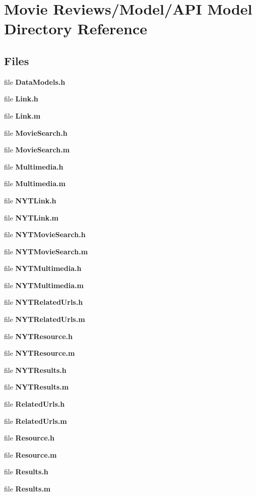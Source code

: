 \section{Movie Reviews/\+Model/\+A\+P\+I Model Directory Reference}
\label{dir_39b7a2f16d8bb207ce5a94853759f064}
\subsection*{Files}
\begin{DoxyCompactItemize}
\item 
file {\bfseries Data\+Models.\+h}
\item 
file {\bfseries Link.\+h}
\item 
file {\bfseries Link.\+m}
\item 
file {\bfseries Movie\+Search.\+h}
\item 
file {\bfseries Movie\+Search.\+m}
\item 
file {\bfseries Multimedia.\+h}
\item 
file {\bfseries Multimedia.\+m}
\item 
file {\bfseries N\+Y\+T\+Link.\+h}
\item 
file {\bfseries N\+Y\+T\+Link.\+m}
\item 
file {\bfseries N\+Y\+T\+Movie\+Search.\+h}
\item 
file {\bfseries N\+Y\+T\+Movie\+Search.\+m}
\item 
file {\bfseries N\+Y\+T\+Multimedia.\+h}
\item 
file {\bfseries N\+Y\+T\+Multimedia.\+m}
\item 
file {\bfseries N\+Y\+T\+Related\+Urls.\+h}
\item 
file {\bfseries N\+Y\+T\+Related\+Urls.\+m}
\item 
file {\bfseries N\+Y\+T\+Resource.\+h}
\item 
file {\bfseries N\+Y\+T\+Resource.\+m}
\item 
file {\bfseries N\+Y\+T\+Results.\+h}
\item 
file {\bfseries N\+Y\+T\+Results.\+m}
\item 
file {\bfseries Related\+Urls.\+h}
\item 
file {\bfseries Related\+Urls.\+m}
\item 
file {\bfseries Resource.\+h}
\item 
file {\bfseries Resource.\+m}
\item 
file {\bfseries Results.\+h}
\item 
file {\bfseries Results.\+m}
\end{DoxyCompactItemize}
